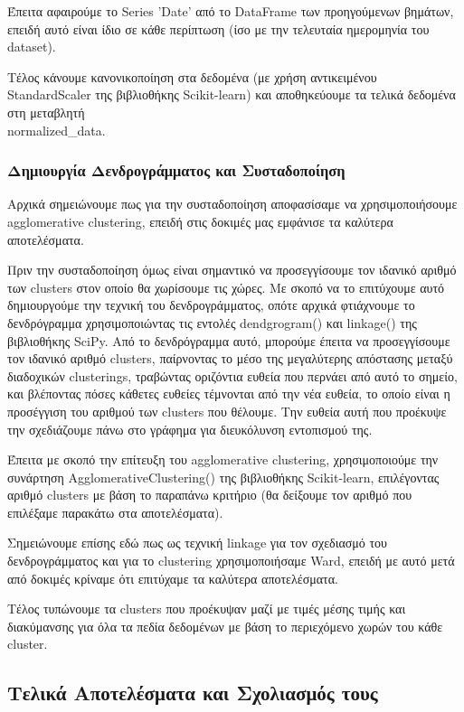 \documentclass[12pt,a4paper]{article}
\begin{document}
Έπειτα αφαιρούμε το Series 'Date' από το DataFrame των προηγούμενων βημάτων, επειδή αυτό είναι ίδιο σε κάθε περίπτωση (ίσο με την τελευταία ημερομηνία του dataset).

Τέλος κάνουμε κανονικοποίηση στα δεδομένα (με χρήση αντικειμένου StandardScaler της βιβλιοθήκης Scikit-learn) και αποθηκεύουμε τα τελικά δεδομένα στη μεταβλητή \\normalized\_data.

\subsubsection{Δημιουργία Δενδρογράμματος και Συσταδοποίηση}

Αρχικά σημειώνουμε πως για την συσταδοποίηση αποφασίσαμε να χρησιμοποιήσουμε agglomerative clustering, επειδή στις δοκιμές μας εμφάνισε τα καλύτερα αποτελέσματα.

Πριν την συσταδοποίηση όμως είναι σημαντικό να προσεγγίσουμε τον ιδανικό αριθμό των clusters στον οποίο θα χωρίσουμε τις χώρες. Με σκοπό να το επιτύχουμε αυτό δημιουργούμε την τεχνική του δενδρογράμματος, οπότε αρχικά φτιάχνουμε το δενδρόγραμμα χρησιμοποιώντας τις εντολές dendgrogram() και linkage() της βιβλιοθήκης SciPy. Από το δενδρόγραμμα αυτό, μπορούμε έπειτα να προσεγγίσουμε τον ιδανικό αριθμό clusters, παίρνοντας το μέσο της μεγαλύτερης απόστασης μεταξύ διαδοχικών clusterings, τραβώντας οριζόντια ευθεία που περνάει από αυτό το σημείο, και βλέποντας πόσες κάθετες ευθείες τέμνονται από την νέα ευθεία, το οποίο είναι η προσέγγιση του αριθμού των clusters που θέλουμε. Την ευθεία αυτή που προέκυψε την σχεδιάζουμε πάνω στο γράφημα για διευκόλυνση εντοπισμού της.

Έπειτα με σκοπό την επίτευξη του agglomerative clustering, χρησιμοποιούμε την συνάρτηση AgglomerativeClustering() της βιβλιοθήκης Scikit-learn, επιλέγοντας αριθμό clusters με βάση το παραπάνω κριτήριο (θα δείξουμε τον αριθμό που επιλέξαμε παρακάτω στα αποτελέσματα).

Σημειώνουμε επίσης εδώ πως ως τεχνική linkage για τον σχεδιασμό του δενδρογράμματος και για το clustering χρησιμοποιήσαμε Ward, επειδή με αυτό μετά από δοκιμές κρίναμε ότι επιτύχαμε τα καλύτερα αποτελέσματα.

Τέλος τυπώνουμε τα clusters που προέκυψαν μαζί με τιμές μέσης τιμής και διακύμανσης για όλα τα πεδία δεδομένων με βάση το περιεχόμενο χωρών του κάθε cluster.

\subsection{Τελικά Αποτελέσματα και Σχολιασμός τους}
\end{document}
